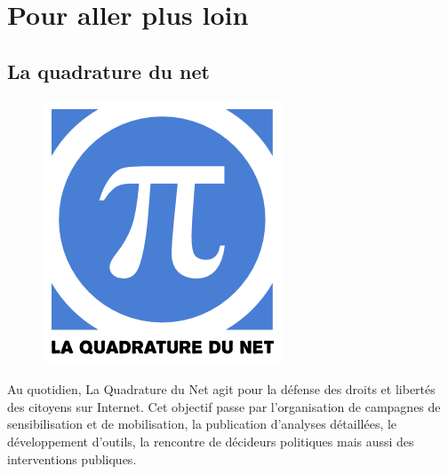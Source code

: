 \documentclass[a4paper,11pt,sf]{leaflet}
\begin{document}
\section{Pour aller plus loin}\label{pour-aller-plus-loin}

\subsection{La quadrature du net}\label{la-quadrature-du-net}

\begin{figure}
\includegraphics[width=\linewidth]{quadraturenet.png}
\end{figure}

Au quotidien, La Quadrature du Net agit pour la défense des droits et
libertés des citoyens sur Internet. Cet objectif passe par
l'organisation de campagnes de sensibilisation et de mobilisation, la
publication d'analyses détaillées, le développement d'outils, la
rencontre de décideurs politiques mais aussi des interventions
publiques.
\end{document}
